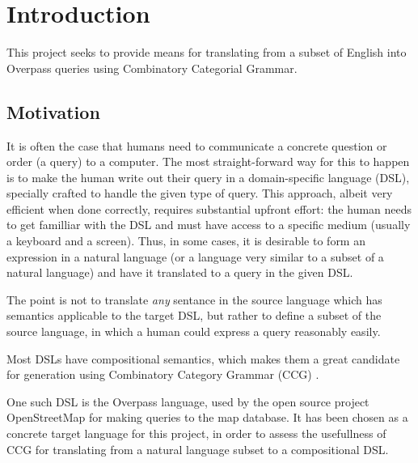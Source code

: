 \documentclass[main.tex]{subfiles}
\begin{document}
\section{Introduction}
This project seeks to provide means for translating from a subset of English
into Overpass queries using Combinatory Categorial Grammar.

\subsection{Motivation}
It is often the case that humans need to communicate a concrete question
or order (a query) to a computer. The most straight-forward way for this to happen is
to make the human write out their query in a domain-specific language (DSL),
specially crafted to handle the given type of query. This approach, albeit
very efficient when done correctly, requires substantial upfront effort:
the human needs to get familliar with the DSL and must have access to a specific
medium (usually a keyboard and a screen). Thus, in some cases, it is desirable
to form an expression in a natural language (or a language very similar to a
subset of a natural language) and have it translated to a query in the given
DSL.

The point is not to translate \emph{any} sentance in the source language
which has semantics applicable to the target DSL, but rather to define a
subset of the source language, in which a human could express a query
reasonably easily.

Most DSLs have compositional semantics, which makes them a great candidate
for generation using Combinatory Category Grammar (CCG) \cite[p.~181]{nts}.

One such DSL is the Overpass language, used by the open source project
OpenStreetMap for making queries to the map database. It has been chosen as
a concrete target language for this project, in order to assess the usefullness
of CCG for translating from a natural language subset to a compositional
DSL.

\end{document}
